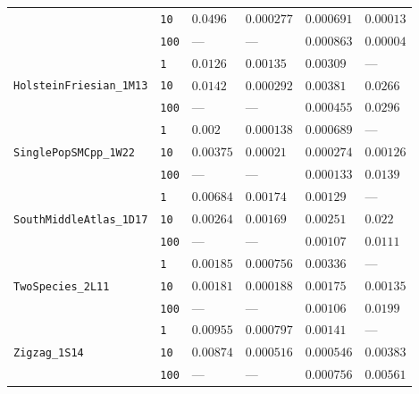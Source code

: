 \documentclass{article}
\begin{document}
\begin{footnotesize}
\begin{tabular}{llllll}
 & \texttt{10} & $0.0496$ & $0.000277$ & $0.000691$ & $0.00013$ \\
 & \texttt{100} & --- & --- & $0.000863$ & $0.00004$ \\
\cline{1-6}
\multirow[c]{3}{*}{\texttt{HolsteinFriesian\_1M13}} & \texttt{1} & $0.0126$ & $0.00135$ & $0.00309$ & --- \\
 & \texttt{10} & $0.0142$ & $0.000292$ & $0.00381$ & $0.0266$ \\
 & \texttt{100} & --- & --- & $0.000455$ & $0.0296$ \\
\cline{1-6}
\multirow[c]{3}{*}{\texttt{SinglePopSMCpp\_1W22}} & \texttt{1} & $0.002$ & $0.000138$ & $0.000689$ & --- \\
 & \texttt{10} & $0.00375$ & $0.00021$ & $0.000274$ & $0.00126$ \\
 & \texttt{100} & --- & --- & $0.000133$ & $0.0139$ \\
\cline{1-6}
\multirow[c]{3}{*}{\texttt{SouthMiddleAtlas\_1D17}} & \texttt{1} & $0.00684$ & $0.00174$ & $0.00129$ & --- \\
 & \texttt{10} & $0.00264$ & $0.00169$ & $0.00251$ & $0.022$ \\
 & \texttt{100} & --- & --- & $0.00107$ & $0.0111$ \\
\cline{1-6}
\multirow[c]{3}{*}{\texttt{TwoSpecies\_2L11}} & \texttt{1} & $0.00185$ & $0.000756$ & $0.00336$ & --- \\
 & \texttt{10} & $0.00181$ & $0.000188$ & $0.00175$ & $0.00135$ \\
 & \texttt{100} & --- & --- & $0.00106$ & $0.0199$ \\
\cline{1-6}
\multirow[c]{3}{*}{\texttt{Zigzag\_1S14}} & \texttt{1} & $0.00955$ & $0.000797$ & $0.00141$ & --- \\
 & \texttt{10} & $0.00874$ & $0.000516$ & $0.000546$ & $0.00383$ \\
 & \texttt{100} & --- & --- & $0.000756$ & $0.00561$ \\
\cline{1-6}
\bottomrule
\end{tabular}
\end{footnotesize}
\end{document}
